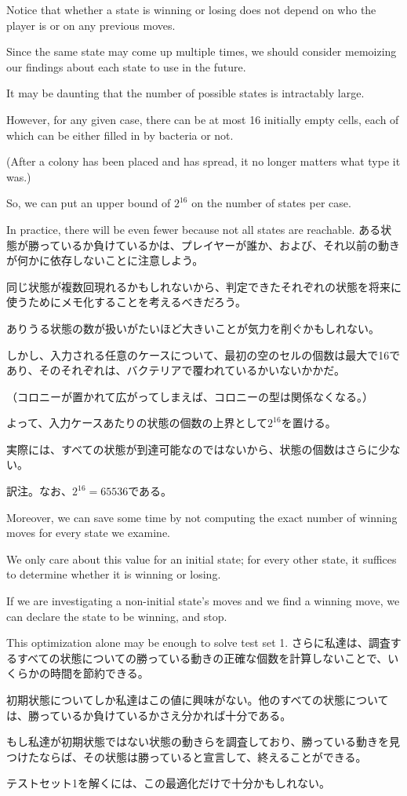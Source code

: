 \documentclass[uplatex,dvipdfmx]{jsarticle} \usepackage{amsmath,amssymb,bm}
\begin{document}
\begin{paracol}{2}
Notice that whether a state is winning or losing does not depend on who the player is or on any previous moves.

Since the same state may come up multiple times, we should consider memoizing our findings about each state to use in the future.

It may be daunting that the number of possible states is intractably large.

However, for any given case, there can be at most 16 initially empty cells, each of which can be either filled in by bacteria or not.

(After a colony has been placed and has spread, it no longer matters what type it was.)

So, we can put an upper bound of $2^{16}$ on the number of states per case.

In practice, there will be even fewer because not all states are reachable.
\switchcolumn
ある状態が勝っているか負けているかは、プレイヤーが誰か、および、それ以前の動きが何かに依存しないことに注意しよう。

同じ状態が複数回現れるかもしれないから、判定できたそれぞれの状態を将来に使うためにメモ化することを考えるべきだろう。

ありうる状態の数が扱いがたいほど大きいことが気力を削ぐかもしれない。

しかし、入力される任意のケースについて、最初の空のセルの個数は最大で16であり、そのそれぞれは、バクテリアで覆われているかいないかかだ。

（コロニーが置かれて広がってしまえば、コロニーの型は関係なくなる。）

よって、入力ケースあたりの状態の個数の上界として$2^{16}$を置ける。

実際には、すべての状態が到達可能なのではないから、状態の個数はさらに少ない。
\end{paracol}
\vspace{\baselineskip}
訳注。なお、$2^{16} = 65536$である。
\vspace{\baselineskip}
\begin{paracol}{2}
Moreover, we can save some time by not computing the exact number of winning moves for every state we examine.

We only care about this value for an initial state; for every other state, it suffices to determine whether it is winning or losing.

If we are investigating a non-initial state's moves and we find a winning move, we can declare the state to be winning, and stop.

This optimization alone may be enough to solve test set 1.
\switchcolumn
さらに私達は、調査するすべての状態についての勝っている動きの正確な個数を計算しないことで、いくらかの時間を節約できる。

初期状態についてしか私達はこの値に興味がない。他のすべての状態については、勝っているか負けているかさえ分かれば十分である。

もし私達が初期状態ではない状態の動きらを調査しており、勝っている動きを見つけたならば、その状態は勝っていると宣言して、終えることができる。

テストセット1を解くには、この最適化だけで十分かもしれない。
\end{paracol}
\end{document}
